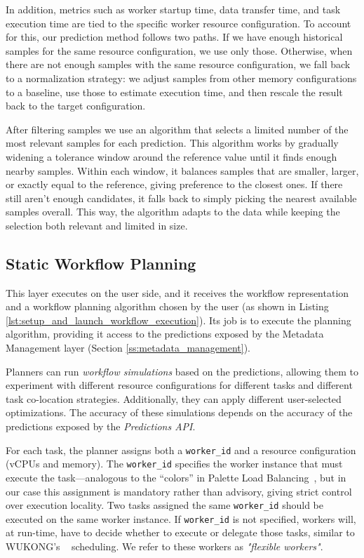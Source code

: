 \documentclass[conference]{IEEEtran}
\begin{document}
In addition, metrics such as worker startup time, data transfer time, and task execution time are tied to the specific worker resource configuration. To account for this, our prediction method follows two paths. If we have enough historical samples for the same resource configuration, we use only those. Otherwise, when there are not enough samples with the same resource configuration, we fall back to a normalization strategy: we adjust samples from other memory configurations to a baseline, use those to estimate execution time, and then rescale the result back to the target configuration. 

After filtering samples we use an algorithm that selects a limited number of the most relevant samples for each prediction. This algorithm works by gradually widening a tolerance window around the reference value until it finds enough nearby samples. Within each window, it balances samples that are smaller, larger, or exactly equal to the reference, giving preference to the closest ones. If there still aren't enough candidates, it falls back to simply picking the nearest available samples overall. This way, the algorithm adapts to the data while keeping the selection both relevant and limited in size.

\subsection{Static Workflow Planning}
This layer executes on the user side, and it receives the workflow representation and a workflow planning algorithm chosen by the user (as shown in Listing \ref{lst:setup_and_launch_workflow_execution}). Its job is to execute the planning algorithm, providing it access to the predictions exposed by the Metadata Management layer (Section \ref{ss:metadata_management}).

Planners can run \textit{workflow simulations} based on the predictions, allowing them to experiment with different resource configurations for different tasks and different task co-location strategies. Additionally, they can apply different user-selected optimizations. The accuracy of these simulations depends on the accuracy of the predictions exposed by the \textit{Predictions API}.

For each task, the planner assigns both a \texttt{worker\_id} and a resource configuration (vCPUs and memory). The \texttt{worker\_id} specifies the worker instance that must execute the task—analogous to the “colors” in Palette Load Balancing~\cite{palette_load_balancing}, but in our case this assignment is mandatory rather than advisory, giving strict control over execution locality. Two tasks assigned the same \texttt{worker\_id} should be executed on the same worker instance. If \texttt{worker\_id} is not specified, workers will, at run-time, have to decide whether to execute or delegate those tasks, similar to WUKONG's ~\cite{wukong_2} scheduling. We refer to these workers as \textit{"flexible workers"}.
\end{document}
